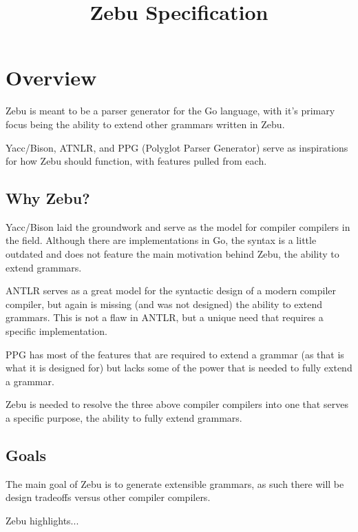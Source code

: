 \documentclass[12pt]{article}
\title{Zebu Specification}
\begin{document}
\maketitle

\section{Overview}

Zebu is meant to be a parser generator for the Go language, with it's primary focus being the ability to extend other grammars written in Zebu.

Yacc/Bison, ATNLR, and PPG (Polyglot Parser Generator) serve as inspirations for how Zebu should function, with features pulled from each. 

\subsection{Why Zebu?}

Yacc/Bison laid the groundwork and serve as the model for compiler compilers in the field. Although there are implementations in Go, the syntax is a little outdated and does not feature the main motivation behind Zebu, the ability to extend grammars.

ANTLR serves as a great model for the syntactic design of a modern compiler compiler, but again is missing (and was not designed) the ability to extend grammars. This is not a flaw in ANTLR, but a unique need that requires a specific implementation.

PPG has most of the features that are required to extend a grammar (as that is what it is designed for) but lacks some of the power that is needed to fully extend a grammar.

Zebu is needed to resolve the three above compiler compilers into one that serves a specific purpose, the ability to fully extend grammars.

\subsection{Goals}

The main goal of Zebu is to generate extensible grammars, as such there will be design tradeoffs versus other compiler compilers. 

Zebu highlights...
\end{document}

